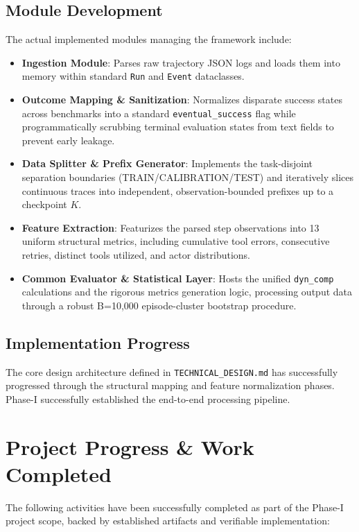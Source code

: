 \documentclass[12pt,a4paper]{article}
\begin{document}
\subsection{Module Development}
The actual implemented modules managing the framework include:
\begin{itemize}
    \item \textbf{Ingestion Module}: Parses raw trajectory JSON logs and loads them into memory within standard \texttt{Run} and \texttt{Event} dataclasses.
    \item \textbf{Outcome Mapping \& Sanitization}: Normalizes disparate success states across benchmarks into a standard \texttt{eventual\_success} flag while programmatically scrubbing terminal evaluation states from text fields to prevent early leakage.
    \item \textbf{Data Splitter \& Prefix Generator}: Implements the task-disjoint separation boundaries (TRAIN/CALIBRATION/TEST) and iteratively slices continuous traces into independent, observation-bounded prefixes up to a checkpoint $K$.
    \item \textbf{Feature Extraction}: Featurizes the parsed step observations into 13 uniform structural metrics, including cumulative tool errors, consecutive retries, distinct tools utilized, and actor distributions.
    \item \textbf{Common Evaluator \& Statistical Layer}: Hosts the unified \texttt{dyn\_comp} calculations and the rigorous metrics generation logic, processing output data through a robust B=10,000 episode-cluster bootstrap procedure.
\end{itemize}

\subsection{Implementation Progress}
The core design architecture defined in \texttt{TECHNICAL\_DESIGN.md} has successfully progressed through the structural mapping and feature normalization phases. Phase-I successfully established the end-to-end processing pipeline.

\newpage


\newpage

\section{Project Progress \& Work Completed}
The following activities have been successfully completed as part of the Phase-I project scope, backed by established artifacts and verifiable implementation:
\end{document}
